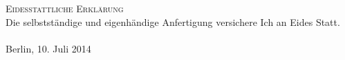 \begin{center}
\textsc{\large Eidesstattliche Erklärung}\\
Die selbstständige und eigenhändige Anfertigung versichere Ich an Eides Statt.
\\
\\

Berlin, 10. Juli 2014
\end{center}
\clearpage